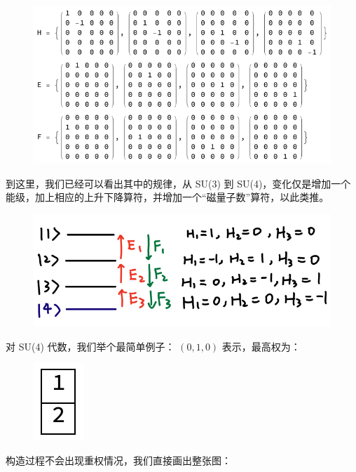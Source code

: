 \documentclass[UTF8]{ctexart}
\begin{document}
\begin{figure}[H]
\begin{centering}
\includegraphics[width=0.6\linewidth]{include/O9}
\par\end{centering}
\end{figure}

\noindent 到这里，我们已经可以看出其中的规律，从 SU(3) 到 SU(4)，变化仅是增加一个能级，加上相应的上升下降算符，并增加一个“磁量子数”算符，以此类推。

\begin{figure}[H]
\begin{centering}
\includegraphics[width=0.5\linewidth]{include/P2}
\par\end{centering}
\end{figure}

\noindent 对 SU(4) 代数，我们举个最简单例子： $(0,1,0)$ 表示，最高权为：

\begin{figure}[H]
\begin{centering}
\includegraphics[width=0.06\linewidth]{include/Y11}
\par\end{centering}
\end{figure}

\noindent 构造过程不会出现重权情况，我们直接画出整张图：
\end{document}
